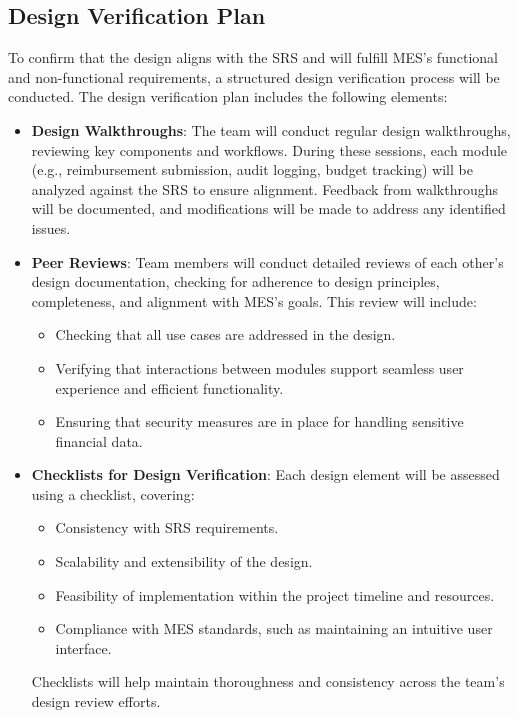 \documentclass[12pt, titlepage]{article}
\begin{document}
\subsection{Design Verification Plan}
To confirm that the design aligns with the SRS and will fulfill MES’s functional and non-functional requirements, a structured design verification process will be conducted. The design verification plan includes the following elements:

\begin{itemize}
    \item \textbf{Design Walkthroughs}: The team will conduct regular design walkthroughs, reviewing key components and workflows. During these sessions, each module (e.g., reimbursement submission, audit logging, budget tracking) will be analyzed against the SRS to ensure alignment. Feedback from walkthroughs will be documented, and modifications will be made to address any identified issues.

    \item \textbf{Peer Reviews}: Team members will conduct detailed reviews of each other’s design documentation, checking for adherence to design principles, completeness, and alignment with MES’s goals. This review will include:
    \begin{itemize}
        \item Checking that all use cases are addressed in the design.
        \item Verifying that interactions between modules support seamless user experience and efficient functionality.
        \item Ensuring that security measures are in place for handling sensitive financial data.
    \end{itemize}

    \item \textbf{Checklists for Design Verification}: Each design element will be assessed using a checklist, covering:
    \begin{itemize}
        \item Consistency with SRS requirements.
        \item Scalability and extensibility of the design.
        \item Feasibility of implementation within the project timeline and resources.
        \item Compliance with MES standards, such as maintaining an intuitive user interface.
    \end{itemize}
    Checklists will help maintain thoroughness and consistency across the team’s design review efforts.


\end{itemize}
\end{document}
